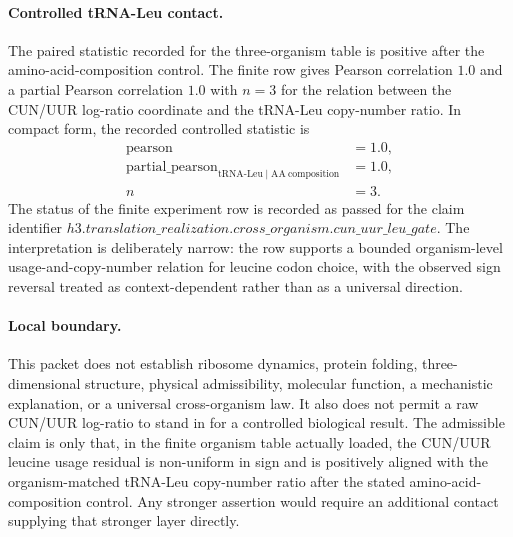 \paragraph{Controlled tRNA-Leu contact.}
The paired statistic recorded for the three-organism table is positive after the amino-acid-composition control. The finite row gives Pearson correlation $1.0$ and a partial Pearson correlation $1.0$ with $n=3$ for the relation between the CUN/UUR log-ratio coordinate and the tRNA-Leu copy-number ratio. In compact form, the recorded controlled statistic is
$$
\begin{aligned}
\operatorname{pearson} &= 1.0,\\
\operatorname{partial\_pearson}_{\mathrm{tRNA\text{-}Leu}\mid \mathrm{AA\ composition}} &= 1.0,\\
n&=3.
\end{aligned}
$$
The status of the finite experiment row is recorded as passed for the claim identifier $h3.translation\_realization.cross\_organism.cun\_uur\_leu\_gate$. The interpretation is deliberately narrow: the row supports a bounded organism-level usage-and-copy-number relation for leucine codon choice, with the observed sign reversal treated as context-dependent rather than as a universal direction.

\paragraph{Local boundary.}
This packet does not establish ribosome dynamics, protein folding, three-dimensional structure, physical admissibility, molecular function, a mechanistic explanation, or a universal cross-organism law. It also does not permit a raw CUN/UUR log-ratio to stand in for a controlled biological result. The admissible claim is only that, in the finite organism table actually loaded, the CUN/UUR leucine usage residual is non-uniform in sign and is positively aligned with the organism-matched tRNA-Leu copy-number ratio after the stated amino-acid-composition control. Any stronger assertion would require an additional contact supplying that stronger layer directly.

